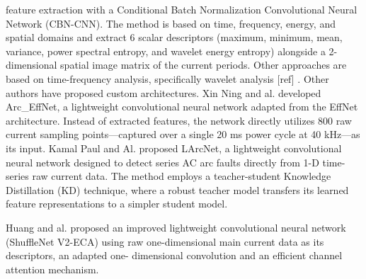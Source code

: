 \documentclass[journal,article,submit,moreauthors]{Definitions/mdpi}
\begin{document}
feature extraction with a Conditional Batch Normalization Convolutional Neural Network
(CBN-CNN). The method is based on time, frequency, energy, and spatial domains and
extract 6 scalar descriptors (maximum, minimum, mean, variance, power spectral entropy,
and wavelet energy entropy) alongside a 2-dimensional spatial image matrix of the current
periods.
Other approaches are based on time-frequency analysis, specifically wavelet analysis [ref] .
Other authors have proposed custom architectures. Xin Ning and al. developed Arc_EffNet, a
lightweight convolutional neural network adapted from the EffNet architecture. Instead of
extracted features, the network directly utilizes 800 raw current sampling points—captured
over a single 20 ms power cycle at 40 kHz—as its input.
Kamal Paul and Al. proposed LArcNet, a lightweight convolutional neural network designed
to detect series AC arc faults directly from 1-D time-series raw current data. The method
employs a teacher-student Knowledge Distillation (KD) technique, where a robust teacher
model transfers its learned feature representations to a simpler student model.

Huang and al. proposed an improved lightweight convolutional neural network (ShuffleNet
V2-ECA) using raw one-dimensional main current data as its descriptors, an adapted one-
dimensional convolution and an efficient channel attention mechanism.
\end{document}
